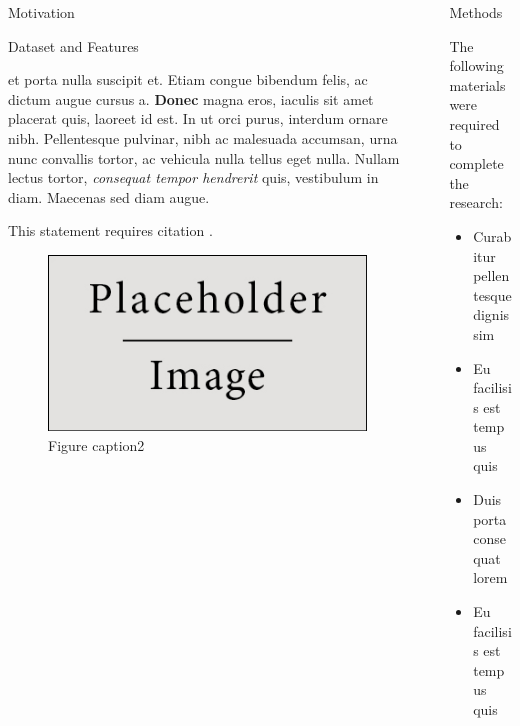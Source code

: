 \documentclass[final]{beamer}
\newlength{\sepwid}
\newlength{\onecolwid}
\begin{document}
\begin{frame}[t]
\begin{columns}[t]
\begin{column}{\onecolwid}
\begin{block}{Motivation}
\end{block}

\begin{block}{Dataset and Features}
	
	 et porta nulla suscipit et. Etiam congue bibendum felis, ac dictum augue cursus a. \textbf{Donec} magna eros, iaculis sit amet placerat quis, laoreet id est. In ut orci purus, interdum ornare nibh. Pellentesque pulvinar, nibh ac malesuada accumsan, urna nunc convallis tortor, ac vehicula nulla tellus eget nulla. Nullam lectus tortor, \textit{consequat tempor hendrerit} quis, vestibulum in diam. Maecenas sed diam augue.
	
	This statement requires citation \cite{Smith:2012qr}.
		\begin{figure}
		\includegraphics[width=0.8\linewidth]{placeholder.jpg}
		\caption{Figure caption2}
	\end{figure}
	
\end{block}


\end{column} %

\begin{column}{\sepwid}\end{column} %



\begin{column}{\onecolwid} %
	\begin{block}{Methods}
		
		The following materials were required to complete the research:
		
		\begin{itemize}
			\item Curabitur pellentesque dignissim
			\item Eu facilisis est tempus quis
			\item Duis porta consequat lorem
			\item Eu facilisis est tempus quis
		\end{itemize}
		

\end{block}
\end{column}
\end{columns}
\end{frame}
\end{document}
